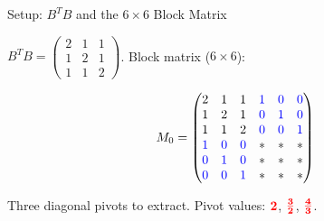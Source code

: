 \documentclass[10pt]{beamer}
\theoremstyle{definition}
\newcommand{\pvt}[1]{{\color{red}\mathbf{#1}}}       %
\newcommand{\bl}[1]{{\color{blue}#1}}                 %
\begin{document}
\begin{frame}{Setup: $B^TB$ and the $6 \times 6$ Block Matrix}

$B^TB = \begin{pmatrix} 2 & 1 & 1 \\ 1 & 2 & 1 \\ 1 & 1 & 2 \end{pmatrix}$. \; Block matrix ($6 \times 6$):

$$M_0 = \begin{pmatrix} 2 & 1 & 1 & \bl{1} & \bl{0} & \bl{0} \\ 1 & 2 & 1 & \bl{0} & \bl{1} & \bl{0} \\ 1 & 1 & 2 & \bl{0} & \bl{0} & \bl{1} \\ \bl{1} & \bl{0} & \bl{0} & * & * & * \\ \bl{0} & \bl{1} & \bl{0} & * & * & * \\ \bl{0} & \bl{0} & \bl{1} & * & * & * \end{pmatrix}$$

Three diagonal pivots to extract. Pivot values: $\pvt{2}$, $\pvt{\tfrac{3}{2}}$, $\pvt{\tfrac{4}{3}}$.

\end{frame}
\end{document}
